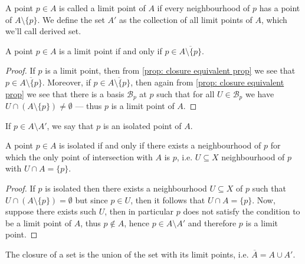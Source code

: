 \begin{definition}
\label{def:limit-point-derived-set}
A point \(p \in A\) is called a limit point of \(A\) if every neighbourhood of
\(p\) has a point of \(A \setminus \{p\}\). We define the set \(A'\) as the
collection of all limit points of \(A\), which we'll call derived set.
\end{definition}

\begin{proposition}
\label{prop:equivalent-def-limit-point}
A point \(p \in A\) is a limit point if and only if \(p \in \overline{A
\setminus \{p\}}\).
\end{proposition}

\begin{proof}
If \(p\) is a limit point, then from \cref{prop: closure equivalent prop} we see
that \(p \in \overline{A \setminus \{p\}}\). Moreover, if \(p \in \overline{A
\setminus \{p\}}\), then again from \cref{prop: closure equivalent prop} we
see that there is a basis \(\mathcal{B}_p\) at \(p\) such that for all \(U \in
\mathcal{B}_p\) we have \(U \cap (A \setminus \{p\}) \neq \emptyset\) --- thus
\(p\) is a limit point of \(A\).
\end{proof}

\begin{definition}
\label{def:isolated-points}
If \(p \in A \setminus A'\), we say that \(p\) is an isolated point of \(A\).
\end{definition}

\begin{proposition}\label{prop:isolated-point-equivalent-def}
A point \(p \in A\) is isolated if and only if there exists a neighbourhood of
\(p\) for which the only point of intersection with \(A\) is \(p\), i.e. \(U
\subseteq X\) neighbourhood of \(p\) with \(U \cap A = \{p\}\).
\end{proposition}

\begin{proof}
If \(p\) is isolated then there exists a neighbourhood \(U \subseteq X\) of
\(p\) such that \(U \cap (A \setminus \{p\}) = \emptyset\) but since \(p \in
U\), then it follows that \(U \cap A = \{p\}\). Now, suppose there exists such
\(U\), then in particular \(p\) does not satisfy the condition to be a limit
point of \(A\), thus \(p \notin A\), hence \(p \in A \setminus A'\) and
therefore \(p\) is a limit point.
\end{proof}

\begin{proposition}
\label{prop:closure-set-plus-limit-points}
The closure of a set is the union of the set with its limit points,
i.e. \(\overline{A} = A \cup A'\).
\end{proposition}

